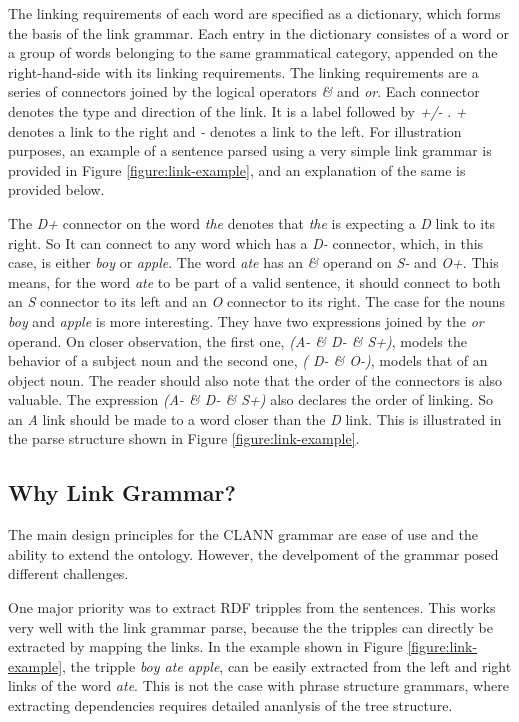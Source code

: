 The linking requirements of each word are specified as a dictionary, which forms the basis of the link grammar.  Each entry in the dictionary consistes of a word or a group of words belonging to the same grammatical category, appended on the right-hand-side with its linking requirements.  The linking requirements are a series of connectors joined by the logical operators \emph{\&} and \emph{or}.  Each connector denotes the type and direction of the link.  It is a label followed by \emph{+/-} .  \emph{+} denotes a link to the right and \emph{-} denotes a link to the left.  For illustration purposes, an example of a sentence parsed using a very simple link grammar is provided in Figure \ref{figure:link-example}, and an explanation of the same is provided below. 



The \emph{D+} connector on the word \emph{the} denotes that \emph{the} is expecting a \emph{D} link to its right.  So It can connect to any word which has a \emph{D-} connector, which, in this case, is either \emph{boy} or \emph{apple}.  The word \emph{ate} has an \emph{\&} operand on \emph{S-} and \emph{O+}.  This means, for the word \emph{ate} to be part of a valid sentence, it should connect to both an \emph{S} connector to its left and an \emph{O} connector to its right.  The case for the nouns \emph{boy} and \emph{apple} is more interesting.  They have two expressions joined by the \emph{or} operand. On closer observation, the first one, \emph{(A- \& D- \& S+)}, models the behavior of a subject noun and the second one, \emph{( D- \& O-)}, models that of an object noun. The reader should also note that the order of the connectors is also valuable. The expression \emph{(A- \& D- \& S+)} also declares the order of linking.  So an \emph{A} link should be made to a word closer than the \emph{D} link. This is illustrated in the parse structure shown in Figure \ref{figure:link-example}. 


\subsection{Why Link Grammar?}

The main design principles for the  CLANN grammar are ease of use and the ability to extend the ontology.  However, the develpoment of the grammar posed different challenges. 

One major priority was to extract RDF tripples from the sentences.  This works very well with the link grammar parse, because the the tripples can directly be extracted by mapping the links.  In the example shown in Figure \ref{figure:link-example}, the tripple \emph{boy ate apple}, can be easily extracted  from the left and right links of the word \emph{ate}.  This is not the case with phrase structure grammars, where extracting dependencies requires detailed ananlysis of the tree structure.   

